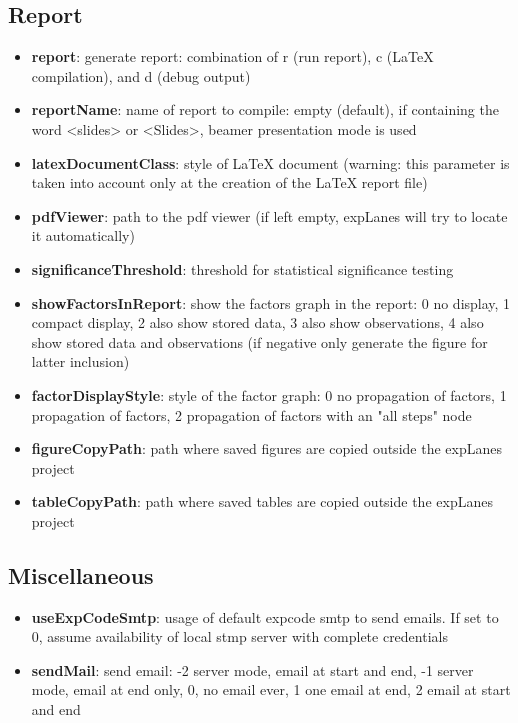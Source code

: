 \documentclass[a4paper,fleqn]{tufte-handout}
\begin{document}
\subsection{Report}

\begin{itemize}
\item \textbf{report}: generate report: combination of r (run report), c (LaTeX compilation), and d (debug output)
\item \textbf{reportName}: name of report to compile: empty (default), if containing the word <slides> or <Slides>,  beamer presentation mode is used
\item \textbf{latexDocumentClass}: style of LaTeX document (warning: this parameter is taken into account only at the creation of the LaTeX report file)
\item \textbf{pdfViewer}: path to the pdf viewer (if left empty, expLanes will try to locate it automatically)
\item \textbf{significanceThreshold}: threshold for statistical significance testing
\item \textbf{showFactorsInReport}: show the factors graph in the report: 0 no display, 1 compact display, 2 also show stored data, 3 also show observations, 4 also show stored data and observations (if negative only generate the figure for latter inclusion)
\item \textbf{factorDisplayStyle}:  style of the factor graph: 0 no propagation of factors, 1 propagation of factors, 2 propagation of factors with an "all steps" node
\item \textbf{figureCopyPath}: path where saved figures are copied outside the expLanes project
\item \textbf{tableCopyPath}: path where saved tables are copied outside the expLanes project
\end{itemize}

\subsection{Miscellaneous}

\begin{itemize}
\item \textbf{useExpCodeSmtp}: usage of default expcode smtp to send emails. If set to 0, assume availability of local stmp server with complete credentials
\item \textbf{sendMail}: send email: -2 server mode, email at start and end, -1 server mode, email at end only, 0, no email ever, 1 one email at end, 2 email at start and end
\end{itemize}
\end{document}
